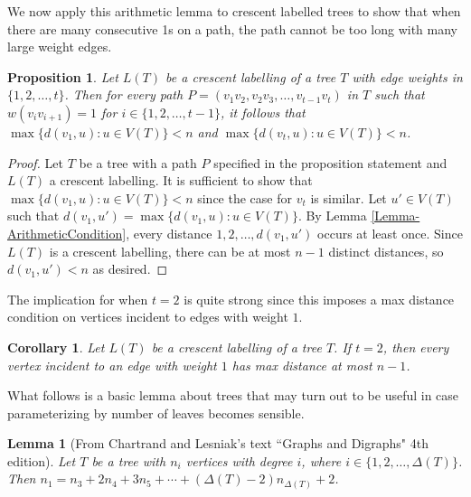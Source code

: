 \documentclass[12]{article}
\newtheorem{lem}{Lemma} %
\newtheorem{prop}[thm]{Proposition}
\newtheorem{cor}[thm]{Corollary}
\theoremstyle{definition}
\begin{document}
	We now apply this arithmetic lemma to crescent labelled trees to show that when there are many consecutive 1s on a path, the path cannot be too long with many large weight edges.
	
	\begin{prop}
		Let $L(T)$ be a crescent labelling of a tree $T$ with edge weights in $\{1,2,\ldots,t\}$.  Then for every path $P = (v_1v_2,v_2v_3,\ldots,v_{t-1}v_t)$ in $T$ such that $w(v_iv_{i+1}) = 1$ for $i \in \{1,2,\ldots,t-1\}$, it follows that $\max\{d(v_1,u): u \in V(T)\} < n$ and $\max\{d(v_t,u): u \in V(T)\} < n$.
	\end{prop}
	
	\begin{proof}
		Let $T$ be a tree with a path $P$ specified in the proposition statement and $L(T)$ a crescent labelling.  It is sufficient to show that $\max\{d(v_1,u): u \in V(T)\} < n$ since the case for $v_t$ is similar.  Let $u' \in V(T)$ such that $d(v_1,u') = \max\{d(v_1,u): u \in V(T)\}$.  By Lemma \ref{Lemma-ArithmeticCondition}, every distance $1,2,\ldots, d(v_1,u')$ occurs at least once.  Since $L(T)$ is a crescent labelling, there can be at most $n-1$ distinct distances, so $d(v_1,u') < n$ as desired. \qedhere
	\end{proof}
	The implication for when $t=2$ is quite strong since this imposes a max distance condition on vertices incident to edges with weight $1$.
	\begin{cor}
		Let $L(T)$ be a crescent labelling of a tree $T$.  If $t = 2$, then every vertex incident to an edge with weight $1$ has max distance at most $n-1$.
	\end{cor}
	
	
	What follows is a basic lemma about trees that may turn out to be useful in case parameterizing by number of leaves becomes sensible.
	
	\begin{lem}[From Chartrand and Lesniak's text ``Graphs and Digraphs" 4th edition]
		Let $T$ be a tree with $n_i$ vertices with degree $i$, where $i \in \{1,2,\ldots,\Delta(T)\}$.  Then $n_1 = n_3 + 2n_4 + 3n_5 + \cdots + (\Delta(T)-2)n_{\Delta(T)} + 2$.
	\end{lem}
	
\end{document}
